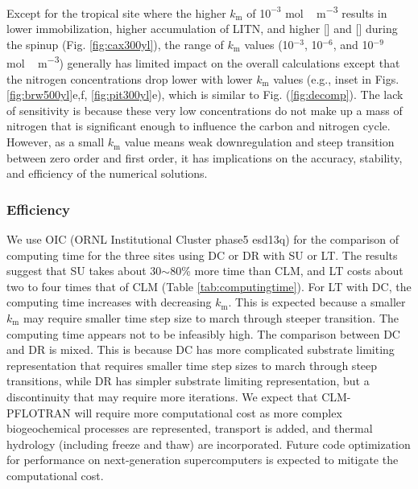 \documentclass[gmd, manuscript]{copernicus}
\begin{document}
Except for the tropical site where the higher $k_\text{m}$ of 1$0^{-3}$
\unit{mol\,m^{-3}} results in lower immobilization, higher accumulation of
LITN, and  higher [] and [] during the spinup (Fig.
\ref{fig:cax300yl}), the range of $k_\text{m}$ values (10$^{-3}$, 10$^{-6}$,
and 10$^{-9}$ \unit{mol\,m^{-3}}) generally has limited impact on the overall
calculations except that the nitrogen concentrations drop lower with lower
$k_\text{m}$ values (e.g., inset in Figs. \ref{fig:brw500yl}e,f,
\ref{fig:pit300yl}e), which is similar to Fig. (\ref{fig:decomp}). The lack of
sensitivity is because these very low concentrations do not make up a mass of
nitrogen that is significant enough to influence the carbon and nitrogen cycle.
However, as a small $k_\text{m}$ value means weak downregulation and steep transition
between zero order and first order, it has implications on the accuracy,
stability, and efficiency of the numerical solutions.

\subsubsection{Efficiency}
We use OIC (ORNL Institutional Cluster phase5 esd13q) for the comparison of
computing time for the three sites using DC or DR with SU or LT. The results
suggest that SU takes about 30$\sim$80\% more time than CLM, and LT costs about
two to four times that of CLM (Table \ref{tab:computingtime}). For LT with DC, the
computing time increases with decreasing $k_\text{m}$. This is expected because
a smaller $k_\text{m}$ may require smaller time step size to march through
steeper transition. The computing time appears not to be infeasibly high. The
comparison between DC and DR is mixed. This is because DC has more complicated
substrate limiting representation that requires smaller time step sizes to march
through steep transitions, while DR has simpler substrate limiting
representation, but a discontinuity that may require more iterations. We expect
that CLM-PFLOTRAN will require more computational cost as more complex
biogeochemical processes are represented, transport is added, and thermal
hydrology (including freeze and thaw) are incorporated. Future code
optimization for performance on next-generation supercomputers is expected to
mitigate the computational cost. 
\end{document}
